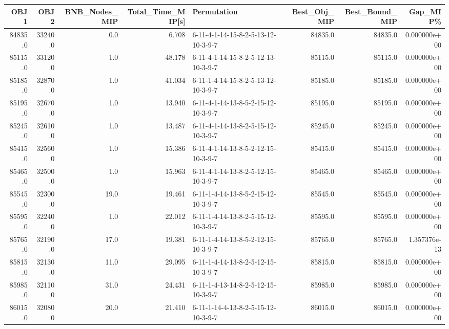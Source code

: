 \begin{tabular}{rrrrlrrr}
\toprule
     OBJ1 &     OBJ2 &  BNB\_Nodes\_MIP &  Total\_Time\_MIP[s] &                          Permutation &  Best\_Obj\_MIP &  Best\_Bound\_MIP &      Gap\_MIP\% \\
\midrule
  84835.0 &  33240.0 &            0.0 &              6.708 &  6-11-4-1-14-15-8-2-5-13-12-10-3-9-7 &       84835.0 &         84835.0 &  0.000000e+00 \\
  85115.0 &  33120.0 &            1.0 &             48.178 &  6-11-4-1-14-15-8-2-5-12-13-10-3-9-7 &       85115.0 &         85115.0 &  0.000000e+00 \\
  85185.0 &  32870.0 &            1.0 &             41.034 &  6-11-1-4-14-15-8-2-5-13-12-10-3-9-7 &       85185.0 &         85185.0 &  0.000000e+00 \\
  85195.0 &  32670.0 &            1.0 &             13.940 &  6-11-4-1-14-13-8-5-2-15-12-10-3-9-7 &       85195.0 &         85195.0 &  0.000000e+00 \\
  85245.0 &  32610.0 &            1.0 &             13.487 &  6-11-4-1-14-13-8-2-5-15-12-10-3-9-7 &       85245.0 &         85245.0 &  0.000000e+00 \\
  85415.0 &  32560.0 &            1.0 &             15.386 &  6-11-4-1-14-13-8-5-2-12-15-10-3-9-7 &       85415.0 &         85415.0 &  0.000000e+00 \\
  85465.0 &  32500.0 &            1.0 &             15.963 &  6-11-4-1-14-13-8-2-5-12-15-10-3-9-7 &       85465.0 &         85465.0 &  0.000000e+00 \\
  85545.0 &  32300.0 &           19.0 &             19.461 &  6-11-1-4-14-13-8-5-2-15-12-10-3-9-7 &       85545.0 &         85545.0 &  0.000000e+00 \\
  85595.0 &  32240.0 &            1.0 &             22.012 &  6-11-1-4-14-13-8-2-5-15-12-10-3-9-7 &       85595.0 &         85595.0 &  0.000000e+00 \\
  85765.0 &  32190.0 &           17.0 &             19.381 &  6-11-1-4-14-13-8-5-2-12-15-10-3-9-7 &       85765.0 &         85765.0 &  1.357376e-13 \\
  85815.0 &  32130.0 &           11.0 &             29.095 &  6-11-1-4-14-13-8-2-5-12-15-10-3-9-7 &       85815.0 &         85815.0 &  0.000000e+00 \\
  85985.0 &  32110.0 &           31.0 &             24.431 &  6-11-1-4-13-14-8-2-5-12-15-10-3-9-7 &       85985.0 &         85985.0 &  0.000000e+00 \\
  86015.0 &  32080.0 &           20.0 &             21.410 &  6-11-1-14-4-13-8-2-5-15-12-10-3-9-7 &       86015.0 &         86015.0 &  0.000000e+00 \\

\end{tabular}
